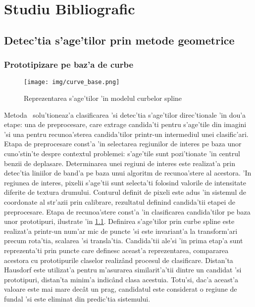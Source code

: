 \documentclass[12pt,a4paper,twoside]{report}
\begin{document}
\chapter{Studiu Bibliografic}
\section{Detec'tia s'age'tilor prin metode geometrice}
\subsection{Prototipizare pe baz'a de curbe}
\begin{figure}[H]
  \texttt{[image: img/curve\_base.png]}
  \centering
  \caption{Reprezentarea s'age'tilor 'in modelul curbelor spline\protect\footnotemark}
  \label{fig:spline}
\end{figure}

Metoda~\cite{CurveBased} solu'tioneaz'a clasificarea 'si detec'tia s'age'tilor direc'tionale 'in dou'a etape: una de preprocesare, care extrage candida'ti pentru s'age'tile din imagini 'si una pentru recunoa'sterea candida'tilor printr-un intermediul unei clasific'ari. Etapa de preprocesare const'a 'in selectarea regiunilor de interes pe baza unor cuno'stin'te despre contextul problemei: s'age'tile sunt pozi'tionate 'in centrul benzii de deplasare. Determinarea unei regiuni de interes este realizat'a prin detec'tia liniilor de band'a pe baza unui algoritm de recunoa'stere al acestora. 'In regiunea de interes, pixelii s'age'tii sunt selecta'ti folosind valorile de intensitate diferite de textura drumului. Conturul definit de pixeli este adus 'in sistemul de coordonate al str'azii prin calibrare, rezultatul definind candida'tii etapei de preprocesare. Etapa de recunoa'stere const'a 'in clasificarea candida'tilor pe baza unor prototipuri, ilustrate 'in \ref{fig:spline}. Definirea s'age'tilor prin curbe spline este realizat'a printr-un num'ar mic de puncte 'si este invariant'a la transform'ari precum rota'tia, scalarea 'si transla'tia. Candida'tii ale'si 'in prima etap'a sunt reprezenta'ti prin puncte care definesc aceast'a reprezentarea, compararea acestora cu prototipurile claselor realiz\^and procesul de clasificare. Distan'ta Hausdorf este utilizat'a pentru m'asurarea similarit'a'tii dintre un candidat 'si prototipuri, distan'ta minim'a indic\^and clasa acestuia. Totu'si, dac'a aceast'a valoare este mai mare dec\^at un prag, candidatul este considerat o regiune de fundal 'si este eliminat din predic'tia sistemului.
\end{document}
